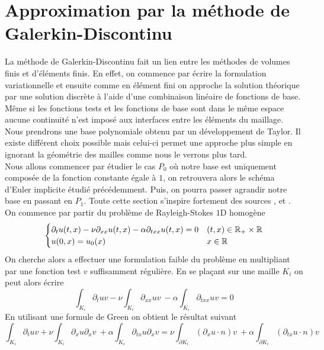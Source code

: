 \section{Approximation par la méthode de Galerkin-Discontinu}
La méthode de Galerkin-Discontinu fait un lien entre les méthodes de volumes finis et d'éléments finis. En effet, on commence par écrire la formulation variationnelle et ensuite comme en élément fini on approche la solution théorique par une solution discrète à l'aide d'une combinaison linéaire de fonctions de base. \\
Même si les fonctions tests et les fonctions de base sont dans le même espace aucune continuité n'est imposé aux interfaces entre les éléments du maillage.
Nous prendrons une base polynomiale obtenu par un développement de Taylor. Il existe différent choix possible mais celui-ci permet une approche plus simple en ignorant la géométrie des mailles comme nous le verrons plus tard. \\
Nous allons commencer par étudier le cas $P_0$ où notre base est uniquement composée de la fonction constante égale à $1$, on retrouvera alors le schéma d'Euler implicite étudié précédemment. Puis, on pourra passer agrandir notre base en passant en $P_1$. Toute cette section s'inspire fortement des sources \cite{DiPietro2012}, \cite{FrancoisVilar2010} et \cite{Gerald2014}.
\\
On commence par partir du problème de Rayleigh-Stokes $1$D homogène
\begin{equation}
    \begin{cases}
        \partial_tu(t,x) - \nu\partial_{xx} u(t,x) - \alpha\partial_{txx} u(t,x) = 0 & (t,x) \in \mathbb R_+ \times \mathbb{R}  \\
        u(0,x) = u_0(x) & x \in \mathbb{R}
    \end{cases}
\end{equation}
On cherche alors a effectuer une formulation faible du problème en multipliant par une fonction test $v$ suffisamment régulière. En se plaçant sur une maille $K_i$ on peut alors écrire
\begin{equation*}
   \int_{K_i} \partial_t uv - \nu \int_{K_i}\partial_{xx}uv \ - \alpha \int_{K_i} \partial_{txx}uv = 0
\end{equation*}
En utilisant une formule de Green on obtient le résultat suivant
\begin{equation*}
    \int_{K_i} \partial_t uv + \nu \int_{K_i}\partial_{x}u\partial_{x}v \ + \alpha \int_{K_i} \partial_{tx}u\partial_{x}v
    =  \nu \int_{\partial K_i}(\partial_{x}u \cdot n)v \ + \alpha \int_{\partial K_i} (\partial_{tx}u \cdot n)v
\end{equation*}
